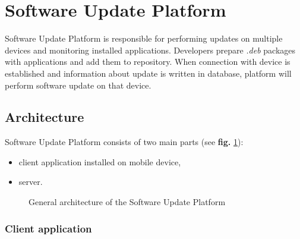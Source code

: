 \section{Software Update Platform}

Software Update Platform is responsible for performing updates on multiple devices and monitoring
installed applications. Developers prepare \emph{.deb} packages with applications and add them to
repository. When connection with device is established and information about update is written in
database, platform will perform software update on that device.


\subsection{Architecture}

Software Update Platform consists of two main parts (see \textbf{fig.} \ref{fig:architecture}):
\begin{itemize}
  \item client application installed on mobile device,
  \item server.
\end{itemize}

\begin{figure}[htbp]
  \centering
    \caption{General architecture of the Software Update Platform}
    \label{fig:architecture}
\end{figure}

\subsubsection*{Client application}


